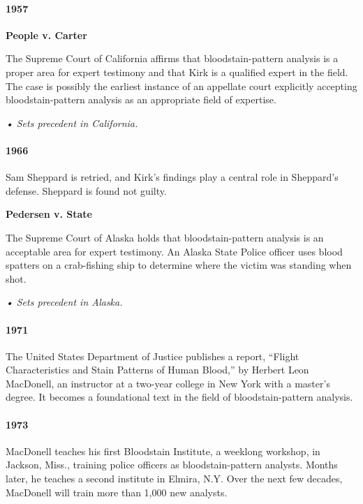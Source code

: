 \hypertarget{1957}{%
\paragraph{1957}\label{1957}}

\textbf{People v. Carter}

The Supreme Court of California affirms that bloodstain-pattern analysis
is a proper area for expert testimony and that Kirk is a qualified
expert in the field. The case is possibly the earliest instance of an
appellate court explicitly accepting bloodstain-pattern analysis as an
appropriate field of expertise.

\emph{• Sets precedent in California.}

\hypertarget{1966}{%
\paragraph{1966}\label{1966}}

Sam Sheppard is retried, and Kirk's findings play a central role in
Sheppard's defense. Sheppard is found not guilty.

\textbf{Pedersen v. State}

The Supreme Court of Alaska holds that bloodstain-pattern analysis is an
acceptable area for expert testimony. An Alaska State Police officer
uses blood spatters on a crab-fishing ship to determine where the victim
was standing when shot.

\emph{• Sets precedent in Alaska.}

\hypertarget{1971}{%
\paragraph{1971}\label{1971}}

The United States Department of Justice publishes a report, ``Flight
Characteristics and Stain Patterns of Human Blood,'' by Herbert Leon
MacDonell, an instructor at a two-year college in New York with a
master's degree. It becomes a foundational text in the field of
bloodstain-pattern analysis.

\hypertarget{1973}{%
\paragraph{1973}\label{1973}}

MacDonell teaches his first Bloodstain Institute, a weeklong workshop,
in Jackson, Miss., training police officers as bloodstain-pattern
analysts. Months later, he teaches a second institute in Elmira, N.Y.
Over the next few decades, MacDonell will train more than 1,000 new
analysts.

